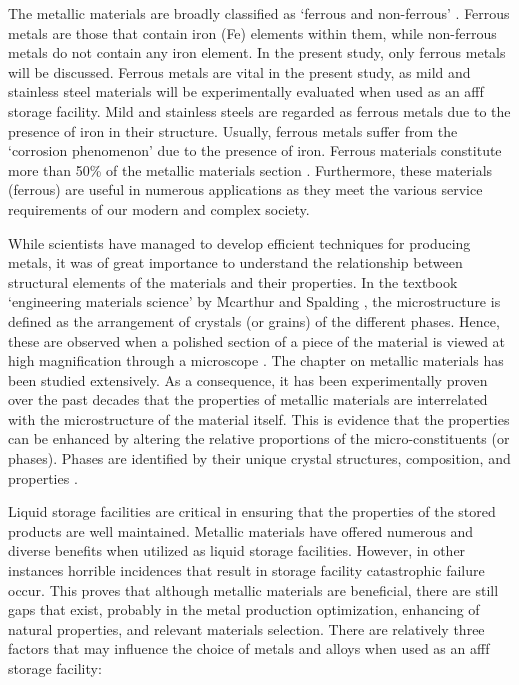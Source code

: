 The metallic materials are broadly classified as ‘ferrous and non-ferrous’ \cite{ali2020empirical}. Ferrous metals are those that contain iron (Fe) elements within them, while non-ferrous metals do not contain any iron element. In the present study, only ferrous metals will be discussed. Ferrous metals are vital in the present study, as mild and stainless steel materials will be experimentally evaluated when used as an \acrshort{afff} storage facility.  Mild and stainless steels are regarded as ferrous metals due to the presence of iron in their structure. Usually, ferrous metals suffer from the ‘corrosion phenomenon’ due to the presence of iron. Ferrous materials constitute more than 50\% of the metallic materials section \cite{ali2020empirical}. Furthermore, these materials (ferrous) are useful in numerous applications as they meet the various service requirements of our modern and complex society.

While scientists have managed to develop efficient techniques for producing metals, it was of great importance to understand the relationship between structural elements of the materials and their properties. In the textbook ‘engineering materials science’ by Mcarthur and Spalding \cite{mcarthur2004engineering}, the microstructure is defined as the arrangement of crystals (or grains) of the different phases. Hence, these are observed when a polished section of a piece of the material is viewed at high magnification through a microscope \cite{molabe2018determining}. The chapter on metallic materials has been studied extensively. As a consequence, it has been experimentally proven over the past decades that the properties of metallic materials are interrelated with the microstructure of the material itself. This is evidence that the properties can be enhanced by altering the relative proportions of the micro-constituents (or phases). Phases are identified by their unique crystal structures, composition, and properties \cite{mcarthur2004engineering}.

Liquid storage facilities are critical in ensuring that the properties of the stored products are well maintained. Metallic materials have offered numerous and diverse benefits when utilized as liquid storage facilities. However, in other instances horrible incidences that result in storage facility catastrophic failure occur. This proves that although metallic materials are beneficial, there are still gaps that exist, probably in the metal production optimization, enhancing of natural properties, and relevant materials selection. There are relatively three factors that may influence the choice of metals and alloys when used as an \acrshort{afff} storage facility:

